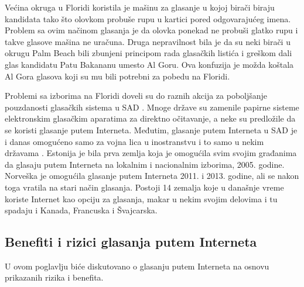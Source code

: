 \documentclass[a4paper]{article}
\theoremstyle{break}
\begin{document}
{Većina okruga u Floridi koristila je mašinu za glasanje u kojoj birači biraju kandidata tako što olovkom probuše rupu u kartici pored odgovarajućeg imena. Problem sa ovim načinom glasanja je da olovka ponekad ne probuši glatko rupu i takve glasove mašina ne uračuna. Druga nepravilnost bila je da su neki birači u okrugu Palm Beach bili zbunjeni principom rada glasačkih listića i greškom dali glas kandidatu Patu Bakananu umesto Al Goru. Ova konfuzija je možda koštala Al Gora glasova koji su mu bili potrebni za pobedu na Floridi.

Problemi sa izborima na Floridi doveli su do raznih akcija za poboljšanje pouzdanosti glasačkih sistema u SAD \cite{knjiga}. Mnoge države su zamenile papirne sisteme elektronskim glasačkim aparatima za direktno očitavanje, a neke su predložile da se koristi glasanje putem Interneta.
Međutim, glasanje putem Interneta u SAD je i danas omogućeno samo za vojna lica u inostranstvu i to samo u nekim državama \cite{i_voting}. Estonija je bila prva zemlja koja je omogućila svim svojim građanima da glasaju putem Interneta na lokalnim i nacionalnim izborima, 2005. godine. 
Norveška je omogućila glasanje putem Interneta 2011. i 2013. godine, ali se nakon toga vratila na stari način glasanja. Postoji 14 zemalja koje u današnje vreme koriste Internet kao opciju za glasanja, makar u nekim svojim delovima i tu spadaju i Kanada, Francuska i Švajcarska.

\subsection{Benefiti i rizici glasanja putem Interneta}
\label{subsec:benefiti_rizici}

U ovom poglavlju biće diskutovano o glasanju putem Interneta na osnovu prikazanih rizika i benefita.\\

}
\end{document}
